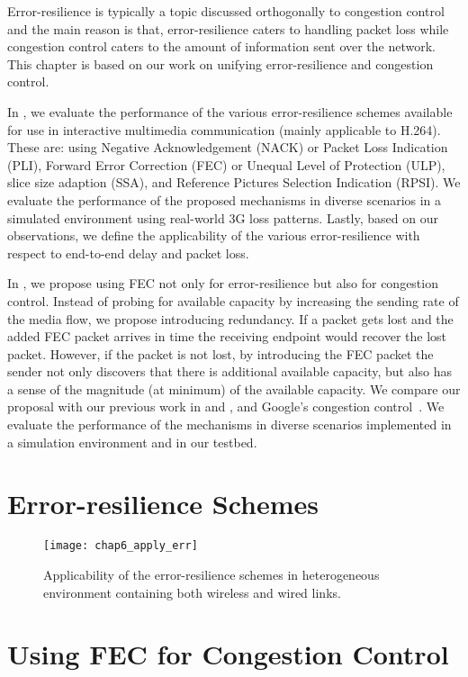 Error-resilience is typically a topic discussed orthogonally to congestion
control and the main reason is that, error-resilience caters to handling
packet loss while congestion control caters to the amount of information sent
over the network. This chapter is based on our work on unifying
error-resilience and congestion control.

In , we evaluate the performance of the various
error-resilience schemes available for use in interactive multimedia
communication (mainly applicable to H.264). These are: using Negative
Acknowledgement (NACK) or Packet Loss Indication (PLI), Forward Error
Correction (FEC) or Unequal Level of Protection (ULP), slice size adaption
(SSA), and Reference Pictures Selection Indication (RPSI). We evaluate the
performance of the proposed mechanisms in diverse scenarios in a simulated
environment using real-world 3G loss patterns. Lastly, based on our
observations, we define the applicability of the various error-resilience with
respect to end-to-end delay and packet loss.

In , we propose using FEC not only for error-resilience but
also for congestion control. Instead of probing for available capacity by
increasing the sending rate of the media flow, we propose introducing
redundancy. If a packet gets lost and the added FEC packet arrives in time the
receiving endpoint would recover the lost packet. However, if the packet is
not lost, by introducing the FEC packet the sender not only discovers that
there is additional available capacity, but also has a sense of the magnitude
(at minimum) of the available capacity. We compare our proposal with our
previous work in  and , and Google's
congestion control~\cite{draft.rrtcc}. We evaluate the performance of the
mechanisms in diverse scenarios implemented in a simulation environment and in
our testbed.

\section{Error-resilience Schemes}

\begin{figure}
\centerline {
\texttt{[image: chap6\_apply\_err]}
}
\caption{Applicability of the error-resilience schemes in heterogeneous
environment containing both wireless and wired links.}
\label{chap6:fig_err}
\end{figure}

\section{Using FEC for Congestion Control}


